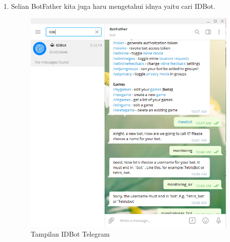 \begin{enumerate}
\begin{enumerate}
    \item Selian BotFather kita juga haru mengetahui idnya yaitu cari IDBot.
     \begin{figure}[H]
    \centering
    \includegraphics[width=1\textwidth]{figures/bot5.png}
    \caption{Tampilan IDBot Telegram}
    \label{print}
    \end{figure}
    

\end{enumerate}
\end{enumerate}
